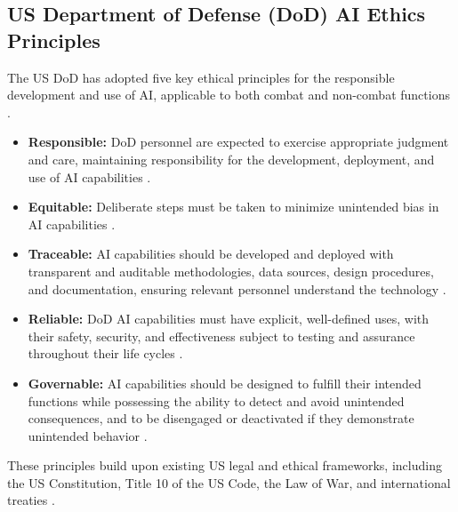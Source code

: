 \subsection{US Department of Defense (DoD) AI Ethics Principles}
The US DoD has adopted five key ethical principles for the responsible development and use of AI, applicable to both combat and non-combat functions \cite{DefenseGov_Ethics_1, DefenseGov_Ethics_2}. 
\begin{itemize}
    \item \textbf{Responsible:} DoD personnel are expected to exercise appropriate judgment and care, maintaining responsibility for the development, deployment, and use of AI capabilities \cite{DTIC_Ethics}. 
    \item \textbf{Equitable:} Deliberate steps must be taken to minimize unintended bias in AI capabilities \cite{InsideCybersecurity_Ethics}. 
    \item \textbf{Traceable:} AI capabilities should be developed and deployed with transparent and auditable methodologies, data sources, design procedures, and documentation, ensuring relevant personnel understand the technology \cite{NPS_Ethics}. 
    \item \textbf{Reliable:} DoD AI capabilities must have explicit, well-defined uses, with their safety, security, and effectiveness subject to testing and assurance throughout their life cycles \cite{NPS_Ethics}. 
    \item \textbf{Governable:} AI capabilities should be designed to fulfill their intended functions while possessing the ability to detect and avoid unintended consequences, and to be disengaged or deactivated if they demonstrate unintended behavior \cite{EuropaEU_Ethics}. 
\end{itemize}
These principles build upon existing US legal and ethical frameworks, including the US Constitution, Title 10 of the US Code, the Law of War, and international treaties \cite{DefenseGov_Ethics_1}.

